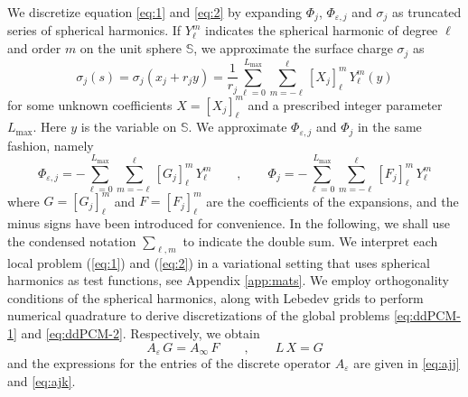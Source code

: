 We discretize equation \eqref{eq:1} and \eqref{eq:2} by expanding $\Phi_j$, $\Phi_{\varepsilon,j}$ and $\sigma_j$ as truncated series of spherical harmonics. If $Y_\ell^m$ indicates the spherical harmonic of degree $\ell$ and order $m$ on the unit sphere $\mathbb{S}$, we approximate the surface charge $\sigma_j$ as
\[
\sigma_j(s) = \sigma_j(x_j + r_j y) = \frac{1}{r_j}\sum_{\ell=0}^{L_\text{max}} \sum_{m = -\ell}^\ell [X_j]_\ell^m \, Y_\ell^m(y)
\]
for some unknown coefficients $X = [X_j]_\ell^m$ and a prescribed integer parameter ${L_\text{max}}$. Here $y$ is the variable on $\mathbb{S}$. We approximate $\Phi_{\varepsilon,j}$ and $\Phi_j$ in the same fashion, namely
\[
\Phi_{\varepsilon,j} = - \sum_{\ell=0}^{L_\text{max}} \sum_{m = -\ell}^\ell [G_j]_\ell^m \, Y_\ell^m \qquad , \qquad \Phi_j = -\sum_{\ell=0}^{L_\text{max}} \sum_{m = -\ell}^\ell [F_j]_\ell^m \, Y_\ell^m
\]
where $G = [G_j]_\ell^m$ and $F = [F_j]_\ell^m$ are the coefficients of the expansions, and the minus signs have been introduced for convenience. In the following, we shall use the condensed notation $\sum_{\ell ,m}$ to indicate the double sum. We interpret each local problem (\ref{eq:1}) and (\ref{eq:2}) in a variational setting that uses spherical harmonics as test functions, see Appendix \ref{app:mats}. We employ orthogonality conditions of the spherical harmonics, along with Lebedev grids to perform numerical quadrature to derive discretizations of the global problems \eqref{eq:ddPCM-1} and \eqref{eq:ddPCM-2}. Respectively, we obtain
\begin{equation}\label{eq:6}
A_\varepsilon \, G = A_\infty \, F \qquad , \qquad  L \, X = G
\end{equation}
and the expressions for the entries of the discrete operator $A_\varepsilon$ are given in \eqref{eq:ajj} and \eqref{eq:ajk}.
